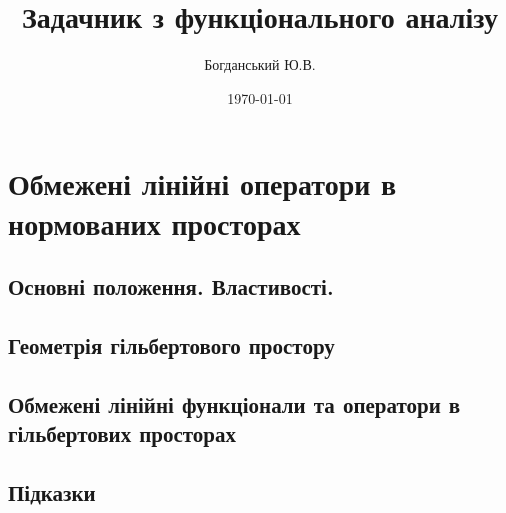 \documentclass{extreport}
\author{Богданський Ю.В.}
\title{Задачник з функціонального аналізу}
\date{\today}
\begin{document}
    \maketitle
    \tableofcontents
    \chapter{Обмежені лінійні оператори в нормованих просторах}
        \section{Основні положення. Властивості.}
            
            
            
        \section{Геометрія гільбертового простору}
            
            
            
            
        \section{Обмежені лінійні функціонали та оператори в гільбертових просторах}
            
            
            
            
        \newpage
        \section*{Підказки}
            
\end{document}
